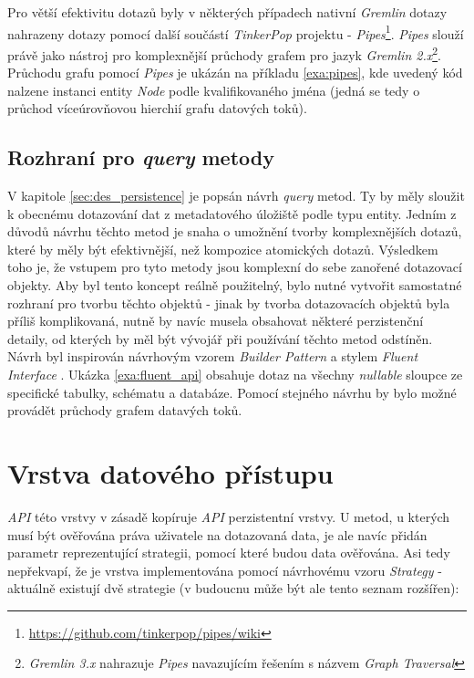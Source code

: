 

Pro větší efektivitu dotazů byly v některých případech nativní \textit{Gremlin} dotazy nahrazeny dotazy pomocí další součástí \textit{TinkerPop} projektu - \textit{Pipes}\footnote{\url{https://github.com/tinkerpop/pipes/wiki}}. \textit{Pipes} slouží právě jako nástroj pro komplexnější průchody grafem pro jazyk \textit{Gremlin 2.x}\footnote{\textit{Gremlin 3.x} nahrazuje \textit{Pipes} navazujícím řešením s názvem \textit{Graph Traversal}}. Průchodu grafu pomocí \textit{Pipes} je ukázán na příkladu \ref{exa:pipes}, kde uvedený kód nalzene instanci entity \textit{Node} podle kvalifikovaného jména (jedná se tedy o průchod víceúrovňovou hierchií grafu datových toků).



\subsection{Rozhraní pro \textit{query} metody}
V kapitole \ref{sec:des_persistence} je popsán návrh \textit{query} metod. Ty by měly sloužit k obecnému dotazování dat z metadatového úložiště podle typu entity. Jedním z důvodů návrhu těchto metod je snaha o umožnění tvorby komplexnějších dotazů, které by měly být efektivnější, než kompozice atomických dotazů. Výsledkem toho je, že vstupem pro tyto metody jsou komplexní do sebe zanořené dotazovací objekty. Aby byl tento koncept reálně použitelný, bylo nutné vytvořit samostatné rozhraní pro tvorbu těchto objektů - jinak by tvorba dotazovacích objektů byla příliš komplikovaná, nutně by navíc musela obsahovat některé perzistenční detaily, od kterých by měl být vývojář při používání těchto metod odstíněn.
Návrh byl inspirován návrhovým vzorem \textit{Builder Pattern} a stylem \textit{Fluent Interface} \cite{Fowler05}. Ukázka \ref{exa:fluent_api} obsahuje dotaz na všechny \textit{nullable} sloupce ze specifické tabulky, schématu a databáze. Pomocí stejného návrhu by bylo možné provádět průchody grafem datavých toků.



\section{Vrstva datového přístupu}
\textit{API} této vrstvy v zásadě kopíruje \textit{API} perzistentní vrstvy.  U metod, u kterých musí být ověřována práva uživatele na dotazovaná data, je ale navíc přidán parametr reprezentující strategii, pomocí které budou data ověřována. Asi tedy nepřekvapí, že je vrstva implementována pomocí návrhovému vzoru \textit{Strategy} - aktuálně existují dvě strategie (v budoucnu může být ale tento seznam rozšířen):

